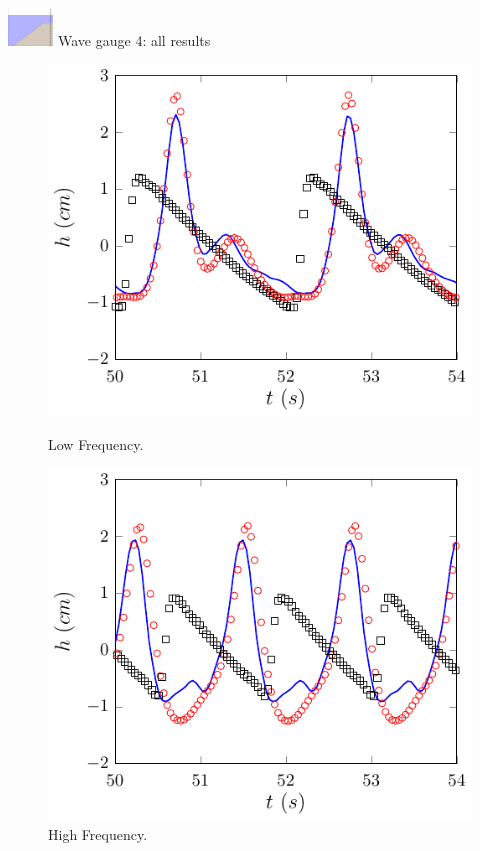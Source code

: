 \documentclass[pdf]{beamer}
\begin{document}
\begin{frame}{\includegraphics[width=1.2cm]{./Pics/WT4z.pdf} \hspace{1cm} Wave gauge 4: all results }
	\begin{figure}
		\centering
		\begin{minipage}{.5\textwidth}
			\centering
			\includegraphics[width=0.9\linewidth]{./Pics/SL/WG4/1-figure0.pdf}
			\caption{Low Frequency.}
		\end{minipage}%
		\begin{minipage}{.5\textwidth}
			\centering
			\includegraphics[width=0.9\linewidth]{./Pics/SH/WG4/1-figure0.pdf}
			\caption{High Frequency.}
		\end{minipage}
	\end{figure}
\end{frame}
\end{document}
